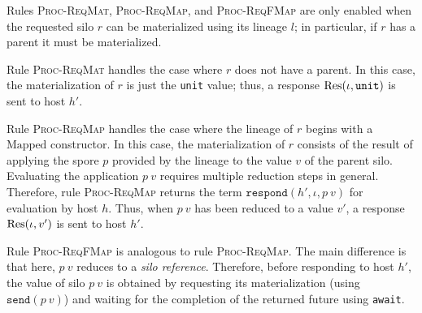 Rules \textsc{Proc-ReqMat}, \textsc{Proc-ReqMap}, and
\textsc{Proc-ReqFMap} are only enabled when the requested silo $r$ can
be materialized using its lineage $l$; in particular, if $r$ has a
parent it must be materialized.

Rule \textsc{Proc-ReqMat} handles the case where $r$ does not have a
parent. In this case, the materialization of $r$ is just the
\verb|unit| value; thus, a response ${\textrm{Res}(\iota, \texttt{unit})}$ is
sent to host $h'$.

Rule \textsc{Proc-ReqMap} handles the case where the lineage of $r$
begins with a $\text{Mapped}$ constructor. In this case, the
materialization of $r$ consists of the result of applying the spore
$p$ provided by the lineage to the value $v$ of the parent
silo. Evaluating the application $p~v$ requires multiple reduction
steps in general. Therefore, rule \textsc{Proc-ReqMap} returns the
term $\texttt{respond}(h', \iota, p~v)$ for evaluation by host $h$.
Thus, when $p~v$ has been reduced to a value $v'$, a response ${\textrm{Res}(\iota, v')}$ is sent to host $h'$.

Rule \textsc{Proc-ReqFMap} is analogous to rule
\textsc{Proc-ReqMap}. The main difference is that here, $p~v$ reduces
to a {\em silo reference}. Therefore, before responding to host $h'$,
the value of silo $p~v$ is obtained by requesting its materialization
(using $\texttt{send}(p~v)$) and waiting for the completion of the
returned future using \verb|await|.


%
%

